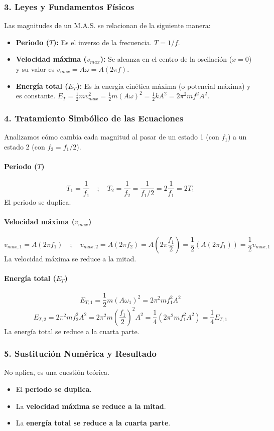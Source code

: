 \subsubsection*{3. Leyes y Fundamentos Físicos}
Las magnitudes de un M.A.S. se relacionan de la siguiente manera:
\begin{itemize}
    \item \textbf{Periodo ($T$):} Es el inverso de la frecuencia. $T = 1/f$.
    \item \textbf{Velocidad máxima ($v_{max}$):} Se alcanza en el centro de la oscilación ($x=0$) y su valor es $v_{max} = A\omega = A(2\pi f)$.
    \item \textbf{Energía total ($E_T$):} Es la energía cinética máxima (o potencial máxima) y es constante. $E_T = \frac{1}{2}mv_{max}^2 = \frac{1}{2}m(A\omega)^2 = \frac{1}{2}kA^2 = 2\pi^2mf^2A^2$.
\end{itemize}

\subsubsection*{4. Tratamiento Simbólico de las Ecuaciones}
Analizamos cómo cambia cada magnitud al pasar de un estado 1 (con $f_1$) a un estado 2 (con $f_2 = f_1/2$).
\paragraph*{Periodo ($T$)}
$$T_1 = \frac{1}{f_1} \quad ; \quad T_2 = \frac{1}{f_2} = \frac{1}{f_1/2} = 2 \frac{1}{f_1} = 2T_1$$
El periodo se duplica.

\paragraph*{Velocidad máxima ($v_{max}$)}
$$v_{max,1} = A(2\pi f_1) \quad ; \quad v_{max,2} = A(2\pi f_2) = A(2\pi \frac{f_1}{2}) = \frac{1}{2} (A(2\pi f_1)) = \frac{1}{2}v_{max,1}$$
La velocidad máxima se reduce a la mitad.

\paragraph*{Energía total ($E_T$)}
$$E_{T,1} = \frac{1}{2}m(A\omega_1)^2 = 2\pi^2mf_1^2A^2$$
$$E_{T,2} = 2\pi^2mf_2^2A^2 = 2\pi^2m(\frac{f_1}{2})^2A^2 = \frac{1}{4}(2\pi^2mf_1^2A^2) = \frac{1}{4}E_{T,1}$$
La energía total se reduce a la cuarta parte.

\subsubsection*{5. Sustitución Numérica y Resultado}
No aplica, es una cuestión teórica.
\begin{cajaresultado}
\begin{itemize}
    \item El \textbf{periodo se duplica}.
    \item La \textbf{velocidad máxima se reduce a la mitad}.
    \item La \textbf{energía total se reduce a la cuarta parte}.
\end{itemize}
\end{cajaresultado}

